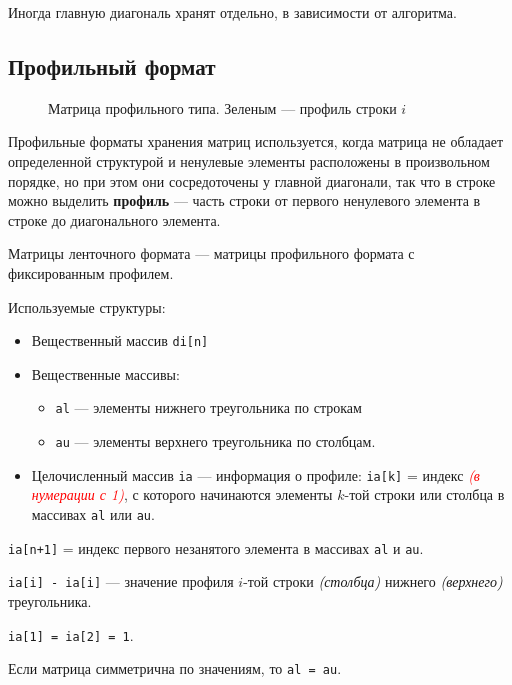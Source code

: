 Иногда главную диагональ хранят отдельно, в зависимости от алгоритма.

\pagebreak

\subsection{Профильный формат}

\begin{wrapfigure}{R}{0.5\textwidth}
    \centering
    
    \caption{Матрица профильного типа. Зеленым --- профиль строки \(i\)}
\end{wrapfigure}
Профильные форматы хранения матриц используется, когда матрица не
обладает определенной структурой и ненулевые элементы расположены в произвольном порядке, но при этом они сосредоточены у главной диагонали, так что в строке можно выделить \textbf{профиль} --- часть строки от первого ненулевого элемента в строке до диагонального элемента.

Матрицы ленточного формата --- матрицы профильного формата с фиксированным профилем.

\pagebreak

Используемые структуры:
\begin{itemize}
    \item Вещественный массив \texttt{di[n]}
    \item Вещественные массивы:
          \begin{itemize}
              \item \texttt{al} --- элементы нижнего треугольника по строкам
              \item \texttt{au} --- элементы верхнего треугольника по столбцам.
          \end{itemize}
    \item Целочисленный массив \texttt{ia} --- информация о профиле: \texttt{ia[k]} = индекс \textcolor{red}{\textit{(в нумерации с 1)}}, с которого начинаются элементы \(k\)-той строки или столбца в массивах \texttt{al} или \texttt{au}.
\end{itemize}

\texttt{ia[n+1]} = индекс первого незанятого элемента в массивах \texttt{al} и \texttt{au}.

\texttt{ia[i] - ia[i]} --- значение профиля \(i\)-той строки \textit{(столбца)} нижнего \textit{(верхнего)} треугольника.

\texttt{ia[1] = ia[2] = 1}.

\begin{remark}
    Если матрица симметрична по значениям, то \texttt{al = au}.
\end{remark}

